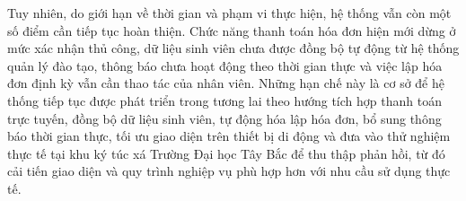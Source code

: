 \documentclass[13pt,a4paper]{extarticle}
\renewcommand{\refname}{DANH MỤC TÀI LIỆU THAM KHẢO}
\renewcommand{\refname}{DANH MỤC TÀI LIỆU THAM KHẢO}%
\numberwithin{figure}{section}
\numberwithin{table}{section}
\begin{document}
	Tuy nhiên, do giới hạn về thời gian và phạm vi thực hiện, hệ thống vẫn còn một số điểm cần tiếp tục hoàn thiện. Chức năng thanh toán hóa đơn hiện mới dừng ở mức xác nhận thủ công, dữ liệu sinh viên chưa được đồng bộ tự động từ hệ thống quản lý đào tạo, thông báo chưa hoạt động theo thời gian thực và việc lập hóa đơn định kỳ vẫn cần thao tác của nhân viên. Những hạn chế này là cơ sở để hệ thống tiếp tục được phát triển trong tương lai theo hướng tích hợp thanh toán trực tuyến, đồng bộ dữ liệu sinh viên, tự động hóa lập hóa đơn, bổ sung thông báo thời gian thực, tối ưu giao diện trên thiết bị di động và đưa vào thử nghiệm thực tế tại khu ký túc xá Trường Đại học Tây Bắc để thu thập phản hồi, từ đó cải tiến giao diện và quy trình nghiệp vụ phù hợp hơn với nhu cầu sử dụng thực tế.
	
	
	\newpage
	\renewcommand{\refname}{DANH MỤC TÀI LIỆU THAM KHẢO}
	
\end{document}
